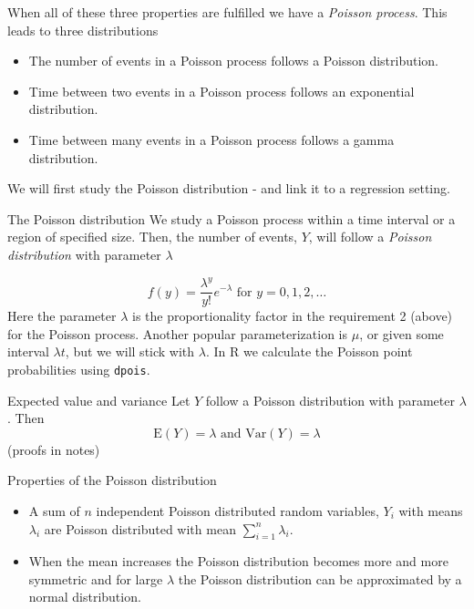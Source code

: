 \documentclass[
  ignorenonframetext,
]{beamer}
\providecommand{\tightlist}{%
  \setlength{\itemsep}{0pt}\setlength{\parskip}{0pt}}
\begin{document}
\begin{frame}
When all of these three properties are fulfilled we have a \emph{Poisson
process}. This leads to three distributions

\begin{itemize}
\tightlist
\item
  The number of events in a Poisson process follows a Poisson
  distribution.
\item
  Time between two events in a Poisson process follows an exponential
  distribution.
\item
  Time between many events in a Poisson process follows a gamma
  distribution.
\end{itemize}

We will first study the Poisson distribution - and link it to a
regression setting.
\end{frame}

\begin{frame}[fragile]
\begin{block}{The Poisson distribution}
\label{the-poisson-distribution}
We study a Poisson process within a time interval or a region of
specified size. Then, the number of events, \(Y\), will follow a
\emph{Poisson distribution} with parameter \(\lambda\)

\[
f(y)=\frac{\lambda^y}{y!}e^{-\lambda} \text{ for } y=0,1,2,…
\] Here the parameter \(\lambda\) is the proportionality factor in the
requirement 2 (above) for the Poisson process. Another popular
parameterization is \(\mu\), or given some interval \(\lambda t\), but
we will stick with \(\lambda\). In R we calculate the Poisson point
probabilities using \texttt{dpois}.
\end{block}
\end{frame}

\begin{frame}
\begin{block}{Expected value and variance}
\label{expected-value-and-variance}
Let \(Y\) follow a Poisson distribution with parameter \(\lambda\). Then
\[\text{E}(Y)=\lambda \text{ and } \text{Var}(Y)=\lambda\] (proofs in
notes)
\end{block}
\end{frame}

\begin{frame}
\begin{block}{Properties of the Poisson distribution}
\label{properties-of-the-poisson-distribution}
\begin{itemize}
\tightlist
\item
  A sum of \(n\) independent Poisson distributed random variables,
  \(Y_i\) with means \(\lambda_i\) are Poisson distributed with mean
  \(\sum_{i=1}^n \lambda_i\).
\item
  When the mean increases the Poisson distribution becomes more and more
  symmetric and for large \(\lambda\) the Poisson distribution can be
  approximated by a normal distribution.
\end{itemize}
\end{block}
\end{frame}
\end{document}
